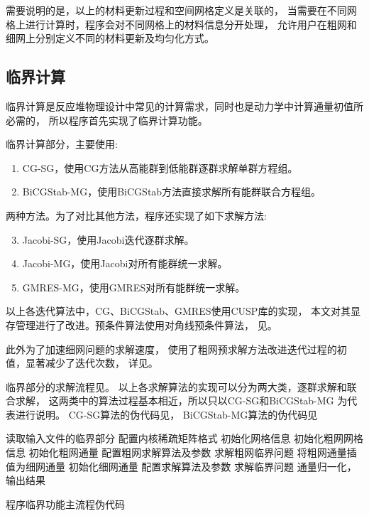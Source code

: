 需要说明的是，以上的材料更新过程和空间网格定义是关联的，
当需要在不同网格上进行计算时，程序会对不同网格上的材料信息分开处理，
允许用户在粗网和细网上分别定义不同的材料更新及均匀化方式。


\subsection{临界计算}
\label{sec:program.eigen}

临界计算是反应堆物理设计中常见的计算需求，同时也是动力学中计算通量初值所必需的，
所以\ProgramName 程序首先实现了临界计算功能。

临界计算部分，\ProgramName 主要使用:
\begin{enumerate}
\item CG-SG，使用CG方法从高能群到低能群逐群求解单群方程组。
\item BiCGStab-MG，使用BiCGStab方法直接求解所有能群联合方程组。
\end{enumerate}
两种方法。为了对比其他方法，程序还实现了如下求解方法:
\begin{enumerate}
\setcounter{enumi}{2}
\item Jacobi-SG，使用Jacobi迭代逐群求解。
\item Jacobi-MG，使用Jacobi对所有能群统一求解。
\item GMRES-MG，使用GMRES对所有能群统一求解。
\end{enumerate}
以上各迭代算法中，CG、BiCGStab、GMRES使用CUSP库的实现，
本文对其显存管理进行了改进。预条件算法使用对角线预条件算法，
见。

此外\ProgramName 为了加速细网问题的求解速度，
使用了粗网预求解方法改进迭代过程的初值，显著减少了迭代次数，
详见。

临界部分的求解流程见。
以上各求解算法的实现可以分为两大类，逐群求解和联合求解，
这两类中的算法过程基本相近，所以只以CG-SG和BiCGStab-MG
为代表进行说明。
CG-SG算法的伪代码见，
BiCGStab-MG算法的伪代码见


\begin{algorithm}
读取输入文件的临界部分\;
配置内核稀疏矩阵格式\;
初始化网格信息\;
{
  初始化粗网网格信息\;
  初始化粗网通量\;
  配置粗网求解算法及参数\;
  求解粗网临界问题\;
  将粗网通量插值为细网通量\;
}
\Else
{
  初始化细网通量\;
}
配置求解算法及参数\;
求解临界问题\;
通量归一化，输出结果\;
\caption{\label{alg:program.eigen.main}\ProgramName 程序临界功能主流程伪代码}
\end{algorithm}


